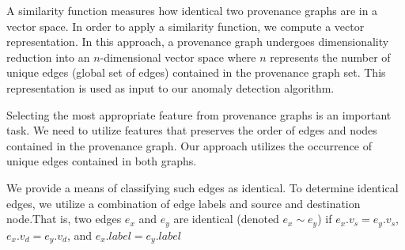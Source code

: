 A similarity function measures how identical two provenance graphs are in a vector space. In order to apply a similarity function, we compute a vector representation. In this approach, a provenance graph undergoes dimensionality reduction into an $n$-dimensional vector space where $n$ represents the number of unique edges (global set of edges) contained in the provenance graph set. This representation is used as input to our anomaly detection algorithm. \par Selecting the most appropriate feature from provenance graphs is an important task. We need to utilize features that preserves the order of edges and nodes contained in the provenance graph. Our approach utilizes the occurrence of unique edges contained in both graphs.  

\par We provide a means of classifying such edges as identical. To determine identical edges, we utilize a combination of edge labels and source and destination node.That is, two edges $e_x $ and $e_y$ are identical (denoted $e_x \sim e_y$) if $e_x.v_s = e_y.v_s$, $e_x.v_d = e_y.v_d$, and $e_x.label = e_y.label$  



%
%
%
%
%
 





